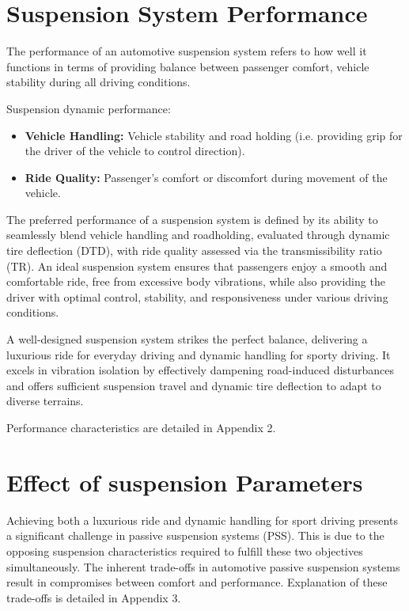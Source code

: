 \section{Suspension System Performance}
The performance of an automotive suspension system refers to how well it functions in terms of providing balance between passenger comfort, vehicle stability during all driving conditions.

Suspension dynamic performance:
	\begin{itemize}[label= ]
		\item \textbf{Vehicle Handling:} Vehicle stability and road holding (i.e. providing grip for the driver of the vehicle to control direction).
		\item \textbf{Ride Quality:} Passenger's comfort or discomfort during movement of the vehicle.	
	\end{itemize}
	
The preferred performance of a suspension system is defined by its ability to seamlessly blend vehicle handling and roadholding, evaluated through dynamic tire deflection (DTD), with ride quality assessed via the transmissibility ratio (TR). An ideal suspension system ensures that passengers enjoy a smooth and comfortable ride, free from excessive body vibrations, while also providing the driver with optimal control, stability, and responsiveness under various driving conditions.
	
A well-designed suspension system strikes the perfect balance, delivering a luxurious ride for everyday driving and dynamic handling for sporty driving. It excels in vibration isolation by effectively dampening road-induced disturbances and offers sufficient suspension travel and dynamic tire deflection to adapt to diverse terrains.
	
Performance characteristics are detailed in Appendix 2.
	
\section{Effect of suspension Parameters}
Achieving both a luxurious ride and dynamic handling for sport driving presents a significant challenge in passive suspension systems (PSS). This is due to the opposing suspension characteristics required to fulfill these two objectives simultaneously. The inherent trade-offs in automotive passive suspension systems result in compromises between comfort and performance.	
Explanation of these trade-offs is detailed in Appendix 3.
	
